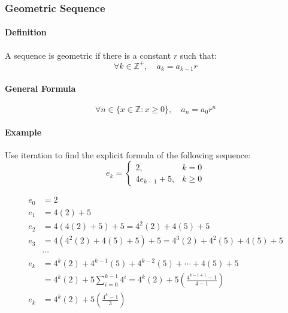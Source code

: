 \subsubsection*{Geometric Sequence}
\paragraph*{Definition}
A sequence is geometric if there is a constant $r$ such that:
\begin{equation*}
    \forall k \in \mathbb{Z}^+, \quad  a_k = a_{k-1}r
\end{equation*}
\paragraph*{General Formula}
\begin{equation*}
    \forall n \in \{x \in \mathbb{Z} : x \geq 0\}, \quad a_n = a_0 r^n
\end{equation*}

\paragraph*{Example}
Use iteration to find the explicit formula of the following sequence:
\begin{equation*}
    e_k = 
    \begin{cases}
        2, & k = 0\\
        4e_{k-1} + 5, & k \geq 0
    \end{cases}
\end{equation*}

\begin{align*}
    e_0 &= 2\\
    e_1 &= 4(2) + 5\\
    e_2 &= 4(4(2) + 5) + 5 = 4^2(2) + 4(5) + 5\\
    e_3 &= 4(4^2(2) + 4(5) + 5) + 5 = 4^3(2) + 4^2(5) + 4(5) + 5\\
    &\cdots\\
    e_k &= 4^k(2) + 4^{k-1}(5) + 4^{k-2}(5) + \cdots + 4(5) + 5\\
    &= 4^k(2) + 5 \sum_{i=0}^{k-1} 4^i = 4^k(2) + 5 (\frac{4^{k-1+1} - 1}{4 - 1})\\
    e_k &= 4^k(2) + 5 (\frac{4^{k} - 1}{3})
\end{align*}